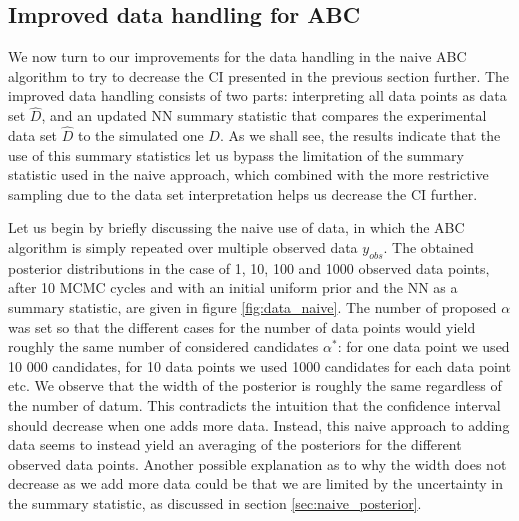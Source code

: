 \documentclass[11pt,a4paper]{article}
\begin{document}
\subsection[Task 4]{Improved data handling for ABC}
\label{sec:result_advanced}
We now turn to our improvements for the data handling in the naive ABC algorithm to try to decrease the CI presented in the previous section further. The improved data handling consists of two parts: interpreting all data points as data set $\hat{D}$, and an updated NN summary statistic that compares the experimental data set $\hat{D}$ to the simulated one $D$. As we shall see, the results indicate that the use of this summary statistics let us bypass the limitation of the summary statistic used in the naive approach, which combined with the more restrictive sampling due to the data set interpretation helps us decrease the CI further.  

Let us begin by briefly discussing the naive use of data, in which the ABC algorithm is simply repeated over multiple observed data $y_{obs}$. The obtained posterior distributions in the case of 1, 10, 100 and 1000 observed data points, after 10 MCMC cycles and with an initial uniform prior and the NN as a summary statistic, are given in figure \ref{fig:data_naive}. The number of proposed $\alpha$ was set so that the different cases for the number of data points would yield roughly the same number of considered candidates $\alpha^*$: for one data point we used 10 000 candidates, for 10 data points we used 1000 candidates for each data point etc. We observe that the width of the posterior is roughly the same regardless of the number of datum. This contradicts the intuition that the confidence interval should decrease when one adds more data. Instead, this naive approach to adding data seems to instead yield an averaging of the posteriors for the different observed data points. Another possible explanation as to why the width does not decrease as we add more data could be that we are limited by the uncertainty in the summary statistic, as discussed in section \ref{sec:naive_posterior}.
\end{document}
